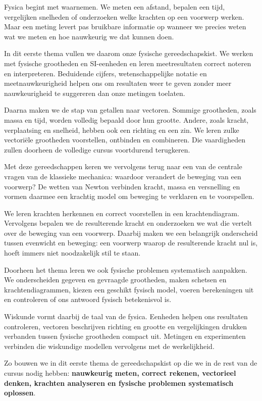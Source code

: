 \documentclass{xourse}
\begin{document}
\begin{themaintro}{}

  Fysica begint met waarnemen. We meten een afstand, bepalen een tijd,
  vergelijken snelheden of onderzoeken welke krachten op een voorwerp
  werken. Maar een meting levert pas bruikbare informatie op wanneer we
  precies weten wat we meten en hoe nauwkeurig we dat kunnen doen.

  In dit eerste thema vullen we daarom onze fysische gereedschapskist.
  We werken met fysische grootheden en SI-eenheden en leren meetresultaten
  correct noteren en interpreteren. Beduidende cijfers, wetenschappelijke
  notatie en meetnauwkeurigheid helpen ons om resultaten weer te geven
  zonder meer nauwkeurigheid te suggereren dan onze metingen toelaten.

  Daarna maken we de stap van getallen naar vectoren. Sommige grootheden,
  zoals massa en tijd, worden volledig bepaald door hun grootte. Andere,
  zoals kracht, verplaatsing en snelheid, hebben ook een richting en een
  zin. We leren zulke vectoriële grootheden voorstellen, ontbinden en
  combineren. Die vaardigheden zullen doorheen de volledige cursus
  voortdurend terugkeren.

  Met deze gereedschappen keren we vervolgens terug naar een van de
  centrale vragen van de klassieke mechanica: waardoor verandert de
  beweging van een voorwerp? De wetten van Newton verbinden kracht,
  massa en versnelling en vormen daarmee een krachtig model om beweging
  te verklaren en te voorspellen.

  We leren krachten herkennen en correct voorstellen in een
  krachtendiagram. Vervolgens bepalen we de resulterende kracht en
  onderzoeken we wat die vertelt over de beweging van een voorwerp.
  Daarbij maken we een belangrijk onderscheid tussen evenwicht en
  beweging: een voorwerp waarop de resulterende kracht nul is, hoeft
  immers niet noodzakelijk stil te staan.

  Doorheen het thema leren we ook fysische problemen systematisch
  aanpakken. We onderscheiden gegeven en gevraagde grootheden, maken
  schetsen en krachtendiagrammen, kiezen een geschikt fysisch model,
  voeren berekeningen uit en controleren of ons antwoord fysisch
  betekenisvol is.

  Wiskunde vormt daarbij de taal van de fysica. Eenheden helpen ons
  resultaten controleren, vectoren beschrijven richting en grootte en
  vergelijkingen drukken verbanden tussen fysische grootheden compact uit.
  Metingen en experimenten verbinden die wiskundige modellen vervolgens
  met de werkelijkheid.

  Zo bouwen we in dit eerste thema de gereedschapskist op die we in de
  rest van de cursus nodig hebben: \textbf{nauwkeurig meten, correct
  rekenen, vectorieel denken, krachten analyseren en fysische problemen
  systematisch oplossen}.

\end{themaintro}
\end{document}

